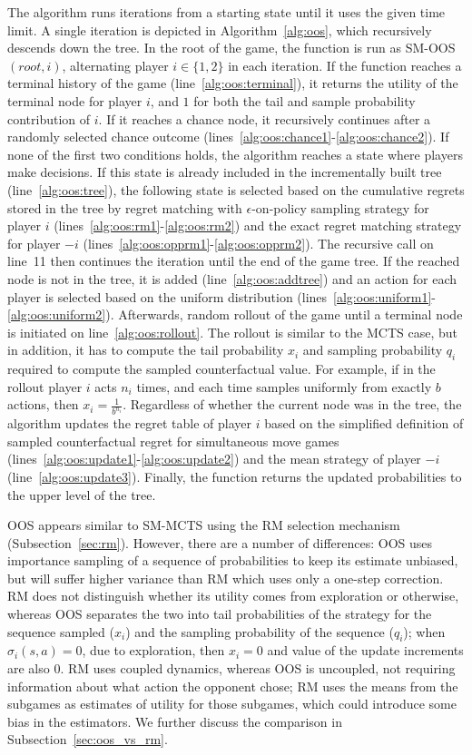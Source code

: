 {The algorithm runs iterations from a starting state until it uses the given time limit. A single iteration is depicted in Algorithm~\ref{alg:oos},
which recursively descends down the tree. In the root of the game, the function is run as SM-OOS$(root, i)$, alternating player $i\in\{1,2\}$ in
each iteration. If the function reaches a terminal history of the game (line~\ref{alg:oos:terminal}), it returns the utility of the terminal node
for player $i$, and $1$ for both the tail and sample probability contribution of $i$. If it reaches a chance node, it recursively continues after
a randomly selected chance outcome (lines~\ref{alg:oos:chance1}-\ref{alg:oos:chance2}). If none of the first two conditions holds, the algorithm
reaches a state where players make decisions. If this state is already included in the incrementally built tree (line~\ref{alg:oos:tree}), the
following state is selected based on the cumulative regrets stored in the tree by regret matching with $\epsilon$-on-policy sampling strategy for
player $i$ (lines~\ref{alg:oos:rm1}-\ref{alg:oos:rm2}) and the exact regret matching strategy for player $-i$ (lines~\ref{alg:oos:opprm1}-\ref{alg:oos:opprm2}).
The recursive call on line~11 then continues the iteration until the end of the game tree. If the reached node is not in the tree,
it is added (line~\ref{alg:oos:addtree}) and an action for each player is selected based on the uniform distribution
(lines~\ref{alg:oos:uniform1}-\ref{alg:oos:uniform2}). Afterwards, random rollout of the game until a terminal node is initiated on line~\ref{alg:oos:rollout}.
The rollout is similar to the MCTS case, but in addition, it has to compute the tail probability $x_i$ and sampling probability $q_i$
required to compute the sampled counterfactual value.
For example, if in the rollout player $i$ acts $n_i$ times, and each time samples uniformly from exactly $b$ actions, then $x_i = \frac{1}{b^{n_i}}$.
Regardless of whether the current node was in the tree, the algorithm updates the regret table of player $i$ based on the simplified definition of sampled counterfactual regret for simultaneous move games (lines~\ref{alg:oos:update1}-\ref{alg:oos:update2}) and the mean strategy of player $-i$ (line~\ref{alg:oos:update3}).
Finally, the function returns the updated probabilities to the upper level of the tree.

OOS appears similar to SM-MCTS using the RM selection mechanism (Subsection~\ref{sec:rm}). However, there are a number of differences:
OOS uses importance sampling of a sequence of probabilities to keep its estimate unbiased, but will suffer higher variance than RM which uses only a one-step correction.
RM does not distinguish whether its utility comes from exploration or otherwise, whereas OOS separates the two into tail probabilities of the strategy for the sequence
sampled ($x_i$) and the sampling probability of the sequence ($q_i$); when $\sigma_i(s,a) = 0$, due to exploration, then $x_i = 0$ and value of the update increments
are also $0$. RM uses coupled dynamics, whereas OOS is uncoupled, not requiring information about what action the opponent chose; RM uses the means from the subgames
as estimates of utility for those subgames, which could introduce some bias in the estimators. We further discuss the comparison in Subsection~\ref{sec:oos_vs_rm}.}

